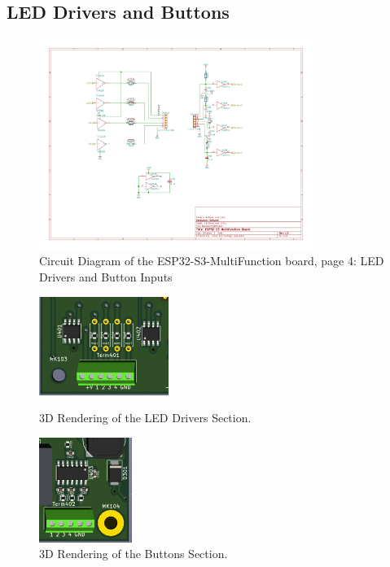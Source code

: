 \subsection{LED Drivers and Buttons}
\begin{figure}[hbpt]\begin{centering}%
\includegraphics[width=3.5in]{ESP32-S3-MultiFunction-4.pdf}
\caption{Circuit Diagram of the ESP32-S3-MultiFunction board, page 4: LED 
Drivers and Button Inputs}
\end{centering}\end{figure}
\begin{figure}[hbpt]\begin{centering}%
\begin{minipage}{.45\textwidth}
  \centering
  \includegraphics{ESP32-S3-MultiFunction-top3D-LEDDrivers.png}
  \caption{3D Rendering of the LED Drivers Section.}
  \label{fig:ESP32-S3-MultiFunction-top3D-LEDDrivers}
\end{minipage}
\begin{minipage}{.45\textwidth}
  \centering
  \includegraphics{ESP32-S3-MultiFunction-top3D-Buttons.png}
  \caption{3D Rendering of the Buttons Section.}
  \label{fig:ESP32-S3-MultiFunction-top3D-Buttons}
\end{minipage}\end{centering}\end{figure}

